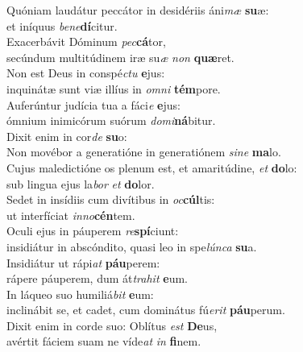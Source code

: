 \evenverse Quóniam laudátur peccátor in desidériis áni\textit{mæ} \textbf{su}æ:~\*\\
\evenverse et iníquus \textit{be}\textit{ne}\textbf{dí}citur.\\
\oddverse Exacerbávit Dóminum \textit{pec}\textbf{cá}tor,~\*\\
\oddverse secúndum multitúdinem iræ su\textit{æ} \textit{non} \textbf{quæ}ret.\\
\evenverse Non est Deus in conspé\textit{ctu} \textbf{e}jus:~\*\\
\evenverse inquinátæ sunt viæ illíus in \textit{om}\textit{ni} \textbf{tém}pore.\\
\oddverse Auferúntur judícia tua a fáci\textit{e} \textbf{e}jus:~\*\\
\oddverse ómnium inimicórum suórum \textit{do}\textit{mi}\textbf{ná}bitur.\\
\evenverse Dixit enim in cor\textit{de} \textbf{su}o:~\*\\
\evenverse Non movébor a generatióne in generatiónem \textit{si}\textit{ne} \textbf{ma}lo.\\
\oddverse Cujus maledictióne os plenum est, et amaritúdine, \textit{et} \textbf{do}lo:~\*\\
\oddverse sub lingua ejus la\textit{bor} \textit{et} \textbf{do}lor.\\
\evenverse Sedet in insídiis cum divítibus in \textit{oc}\textbf{cúl}tis:~\*\\
\evenverse ut interfíciat \textit{in}\textit{no}\textbf{cén}tem.\\
\oddverse Oculi ejus in páuperem \textit{re}\textbf{spí}ciunt:~\*\\
\oddverse insidiátur in abscóndito, quasi leo in spe\textit{lún}\textit{ca} \textbf{su}a.\\
\evenverse Insidiátur ut rápi\textit{at} \textbf{páu}perem:~\*\\
\evenverse rápere páuperem, dum át\textit{tra}\textit{hit} \textbf{e}um.\\
\oddverse In láqueo suo humiliá\textit{bit} \textbf{e}um:~\*\\
\oddverse inclinábit se, et cadet, cum dominátus fú\textit{e}\textit{rit} \textbf{páu}perum.\\
\evenverse Dixit enim in corde suo: Oblítus \textit{est} \textbf{De}us,~\*\\
\evenverse avértit fáciem suam ne víde\textit{at} \textit{in} \textbf{fi}nem.\\

